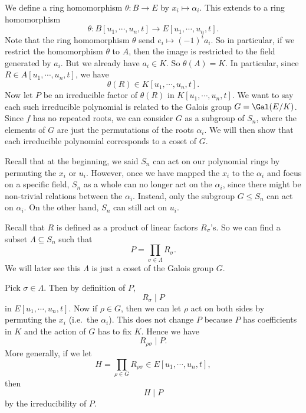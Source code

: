 \documentclass[a4paper]{article}
\begin{document}
We define a ring homomorphism $\theta: B \to E$ by $x_i \mapsto \alpha_i$. This extends to a ring homomorphism
\[
  \theta: B[u_1, \cdots, u_n, t] \to E[u_1, \cdots, u_n, t].
\]
Note that the ring homomorphism $\theta$ send $e_i \mapsto (-1)^i a_i$. So in particular, if we restrict the homomorphism $\theta$ to $A$, then the image is restricted to the field generated by $a_i$. But we already have $a_i \in K$. So $\theta(A) = K$. In particular, since $R \in A[u_1, \cdots, u_n, t]$, we have
\[
  \theta(R) \in K[u_1, \cdots, u_n, t].
\]
Now let $P$ be an irreducible factor of $\theta(R)$ in $K[u_1, \cdots, u_n, t]$. We want to say each such irreducible polynomial is related to the Galois group $G = \Gal(E/K)$. Since $f$ has no repeated roots, we can consider $G$ as a subgroup of $S_n$, where the elements of $G$ are just the permutations of the roots $\alpha_i$. We will then show that each irreducible polynomial corresponds to a coset of $G$.

Recall that at the beginning, we said $S_n$ can act on our polynomial rings by permuting the $x_i$ or $u_i$. However, once we have mapped the $x_i$ to the $\alpha_i$ and focus on a specific field, $S_n$ as a whole can no longer act on the $\alpha_i$, since there might be non-trivial relations between the $\alpha_i$. Instead, only the subgroup $G \leq S_n$ can act on $\alpha_i$. On the other hand, $S_n$ can still act on $u_i$.

Recall that $R$ is defined as a product of linear factors $R_\sigma$'s. So we can find a subset $\Lambda \subseteq S_n$ such that
\[
  P = \prod_{\sigma \in \Lambda} R_\sigma.
\]
We will later see this $\Lambda$ is just a coset of the Galois group $G$.

Pick $\sigma \in \Lambda$. Then by definition of $P$,
\[
  R_\sigma \mid P
\]
in $E[u_1, \cdots, u_n, t]$. Now if $\rho \in G$, then we can let $\rho$ act on both sides by permuting the $x_i$ (i.e.\ the $\alpha_i$). This does not change $P$ because $P$ has coefficients in $K$ and the action of $G$ has to fix $K$. Hence we have
\[
  R_{\rho\sigma} \mid P.
\]
More generally, if we let
\[
  H = \prod_{\rho \in G} R_{\rho \sigma} \in E[u_1, \cdots, u_n, t],
\]
then
\[
  H \mid P
\]
by the irreducibility of $P$.
\end{document}
